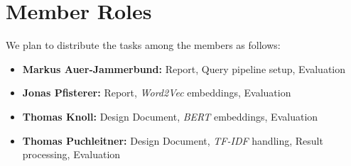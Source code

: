 \documentclass{article}
\newcommand{\wordtovec}{\textit{Word2Vec} }
\newcommand{\bert}{\textit{BERT} }
\newcommand{\tfidf}{\textit{TF-IDF} }
\begin{document}
\section{Member Roles}
We plan to distribute the tasks among the members as follows:
\begin{itemize}
    \item \textbf{Markus Auer-Jammerbund:} Report, Query pipeline setup, Evaluation
    \item \textbf{Jonas Pfisterer:} Report, \wordtovec embeddings, Evaluation
    \item \textbf{Thomas Knoll:} Design Document, \bert embeddings, Evaluation
    \item \textbf{Thomas Puchleitner:} Design Document, \tfidf handling, Result processing, Evaluation
\end{itemize}
\clearpage


\end{document}
